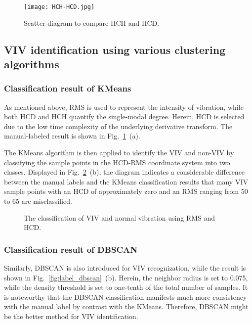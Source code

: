 \documentclass[preprint, 3p, times, compress, 11pt]{elsarticle}
\begin{document}
\begin{figure}[ht]
    \centering
    \texttt{[image: HCH-HCD.jpg]}
    \caption{Scatter diagram to compare HCH and HCD.}
    \label{fig:HCH_HCD}
\end{figure}

\subsection{VIV identification using various clustering algorithms} 

\subsubsection{Classification result of KMeans}

As mentioned above, RMS is used to represent the intensity of vibration, 
while both HCD and HCH quantify the single-modal degree. Herein, HCD is 
selected due to the low time complexity of the underlying derivative 
transform. The manual-labeled result is shown in 
Fig.~\ref{fig:HCH_HCD}~(a).

The KMeans algorithm is then applied to identify the VIV and non-VIV by 
classifying the sample points in the HCD-RMS coordinate system into two 
classes. Displayed in Fig.~\ref{fig:label_kmeans}~(b), 
the diagram indicates a considerable 
difference between the manual labels and the KMeans classification results 
that many VIV sample points with an HCD of approximately zero and an RMS 
ranging from 50 to 65 are misclassified.

\begin{figure}[ht]
    \centering
    \caption{The classification of VIV and normal vibration using RMS and HCD.}
    \label{fig:label_kmeans}
\end{figure}

\subsubsection{Classification result of DBSCAN}

Similarly, DBSCAN is also introduced for VIV recognization, while the 
result is shown in Fig.~\ref{fig:label_dbscan}~(b). Herein, 
the neighbor radius is set to 0.075, while the 
density threshold is set to one-tenth of the total number of samples. It 
is noteworthy that the DBSCAN classification manifests much more 
consistency with the manual label by contrast with the KMeans. Therefore, 
DBSCAN might be the better method for VIV identification. 
\end{document}
